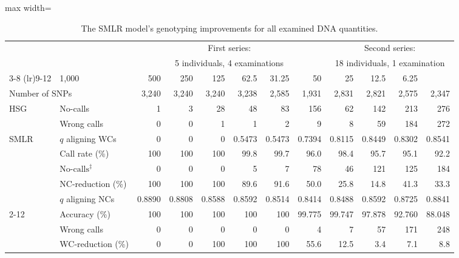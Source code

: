 \begin{table*}
\centering
\caption{The SMLR model's genotyping improvements for all examined DNA quantities.} 
\label{tab:NC_WC}
\vspace{1mm}
\begin{adjustbox}{max width=\textwidth}
\begin{threeparttable}
\begin{tabular}{llrrrrrrrrrr}
  \toprule[2pt]
\null & \null & \multicolumn{6}{c}{First series:} & \multicolumn{4}{c}{Second series:} \\
\null & \null & \multicolumn{6}{c}{5 individuals, 4 examinations} & \multicolumn{4}{c}{18 individuals, 1 examination} \\
\cmidrule(lr){3-8} \cmidrule(lr){9-12}
\multicolumn{2}{l}{DNA quantity (\si{\pg})} & 1,000 & 500 & 250 & 125 & 62.5 & 31.25 & 50 & 25 & 12.5 & 6.25 \\ 
\multicolumn{2}{l}{Number of SNPs} & 3,240 & 3,240 & 3,240 & 3,238 & 2,585 & 1,931 & 2,831 & 2,821 & 2,575 & 2,347 \\ 
\midrule[2pt]
\multirow{2}{*}{HSG\tnote{$*$}} & No-calls & 1 & 3 & 28 & 48 & 83 & 156 & 62 & 142 & 213 & 276 \\ 
   & Wrong calls & 0 & 0 & 1 & 1 & 2 & 9 & 8 & 59 & 184 & 272 \\ 
\midrule[2pt]
\multirow{5}{*}{SMLR\tnote{$\dagger$}}  & $q$ aligning WCs & 0 & 0 & 0 & 0.5473 & 0.5473 & 0.7394 & 0.8115 & 0.8449 & 0.8302 & 0.8541 \\ 
\cmidrule(lr){2-12}
   & Call rate (\%) & 100 & 100 & 100 & 99.8 & 99.7 & 96.0 & 98.4 & 95.7 & 95.1 & 92.2 \\ 
   & $\text{No-calls}^{\ddagger}$ & 0 & 0 & 0 & 5 & 7 & 78 & 46 & 121 & 125 & 184 \\ 
   & NC-reduction (\%)\tnote{$\S$} & 100 & 100 & 100 & 89.6 & 91.6 & 50.0 & 25.8 & 14.8 & 41.3 & 33.3 \\ 
\midrule[2pt]
\multirow{5}{*}{SMLR\tnote{$\ddagger$}} & $q$ aligning NCs & 0.8890 & 0.8808 & 0.8588 & 0.8592 & 0.8514 & 0.8414 & 0.8488 & 0.8592 & 0.8725 & 0.8841 \\ 
\cmidrule(lr){2-12}
   & Accuracy (\%) & 100 & 100 & 100 & 100 & 100 & 99.775 & 99.747 & 97.878 & 92.760 & 88.048 \\ 
   & Wrong calls & 0 & 0 & 0 & 0 & 0 & 4 & 7 & 57 & 171 & 248 \\ 
   & WC-reduction (\%)\tnote{$\S$} & 0 & 0 & 100 & 100 & 100 & 55.6 & 12.5 & 3.4 & 7.1 & 8.8 \\ 
   \bottomrule[2pt]
\end{tabular}

\end{threeparttable}
\end{adjustbox}
\end{table*}
